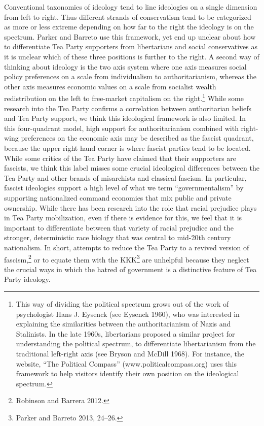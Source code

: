 \documentclass[12pt,]{article}
\begin{document}
Conventional taxonomies of ideology tend to line ideologies on a single
dimension from left to right. Thus different strands of conservatism
tend to be categorized as more or less extreme depending on how far to
the right the ideology is on the spectrum. Parker and Barreto use this
framework, yet end up unclear about how to differentiate Tea Party
supporters from libertarians and social conservatives as it is unclear
which of these three positions is further to the right. A second way of
thinking about ideology is the two axis system where one axis measures
social policy preferences on a scale from individualism to
authoritarianism, whereas the other axis measures economic values on a
scale from socialist wealth redistribution on the left to free-market
capitalism on the right.\footnote{This way of dividing the political
  spectrum grows out of the work of psychologist Hans J. Eysenck (see
  Eysenck 1960), who was interested in explaining the similarities
  between the authoritarianism of Nazis and Stalinists. In the late
  1960s, libertarians proposed a similar project for understanding the
  political spectrum, to differentiate libertarianism from the
  traditional left-right axis (see Bryson and McDill 1968). For
  instance, the website, ``The Political Compass''
  (www.politicalcompass.org) uses this framework to help visitors
  identify their own position on the ideological spectrum.} While some
research into the Tea Party confirms a correlation between authoritarian
beliefs and Tea Party support, we think this ideological framework is
also limited. In this four-quadrant model, high support for
authoritarianism combined with right-wing preferences on the economic
axis may be described as the fascist quadrant, because the upper right
hand corner is where fascist parties tend to be located. While some
critics of the Tea Party have claimed that their supporters are
fascists, we think this label misses some crucial ideological
differences between the Tea Party and other brands of misarchists and
classical fascism. In particular, fascist ideologies support a high
level of what we term ``governmentalism'' by supporting nationalized
command economies that mix public and private ownership. While there has
been research into the role that racial prejudice plays in Tea Party
mobilization, even if there is evidence for this, we feel that it is
important to differentiate between that variety of racial prejudice and
the stronger, deterministic race biology that was central to mid-20th
century nationalism. In short, attempts to reduce the Tea Party to a
revived version of fascism,\footnote{Robinson and Barrera 2012. } or to
equate them with the KKK\footnote{Parker and Barreto 2013, 24--26. }
are unhelpful because they neglect the crucial ways in which the hatred
of government is a distinctive feature of Tea Party ideology.
\end{document}

